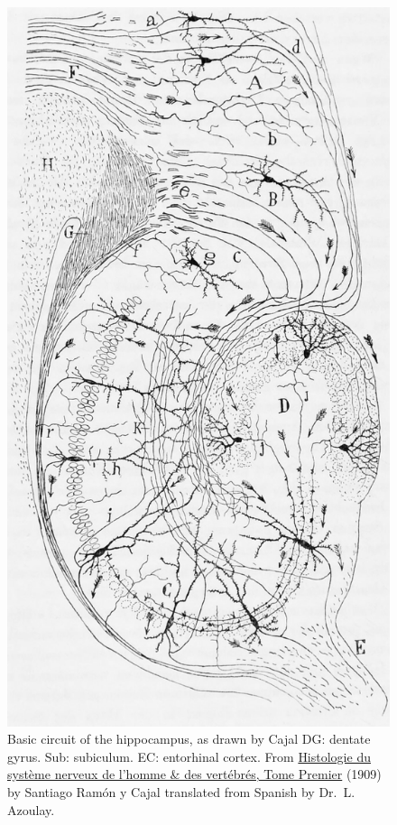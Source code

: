 \begin{figure}

{\centering \includegraphics[width=0.7\linewidth]{./figures/cns/CajalHippocampus} 

}

\caption{Basic circuit of the hippocampus, as drawn by Cajal DG: dentate gyrus. Sub: subiculum. EC: entorhinal cortex. From \href{https://wellcomelibrary.org/item/b2129592x\#?c=0\&m=0\&s=0\&cv=14\&z=0\%2C-3.48\%2C1\%2C8.6591}{Histologie du système nerveux de l'homme \& des vertébrés, Tome Premier} (1909) by Santiago Ramón y Cajal translated from Spanish by Dr.~L. Azoulay.}\label{fig:hippocircuit}
\end{figure}

